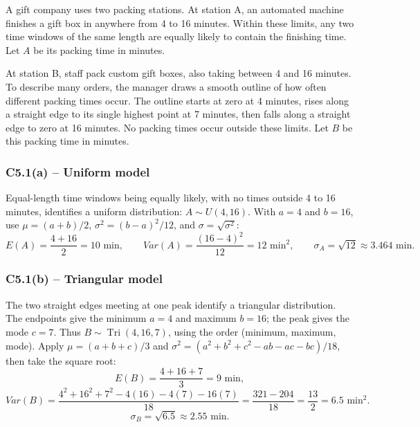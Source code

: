 {
A gift company uses two packing stations. At station A, an automated machine
finishes a gift box in anywhere from 4 to 16 minutes. Within these limits,
any two time windows of the same length are equally likely to contain the
finishing time. Let $A$ be its packing time in minutes.

At station B, staff pack custom gift boxes, also taking between 4 and 16
minutes. To describe many orders, the manager draws a smooth outline of how
often different packing times occur. The outline starts at zero at 4 minutes,
rises along a straight edge to its single highest point at 7 minutes, then
falls along a straight edge to zero at 16 minutes. No packing times occur
outside these limits. Let $B$ be this packing time in minutes.
\label{sol:c5-1a}
\subsubsection*{C5.1(a) -- Uniform model }
Equal-length time windows being equally likely, with no times outside
4 to 16 minutes, identifies a uniform distribution: $A\sim U(4,16)$.
With $a=4$ and $b=16$, use $\mu=(a+b)/2$,
$\sigma^2=(b-a)^2/12$, and $\sigma=\sqrt{\sigma^2}$:
\[
E(A)=\frac{4+16}{2}=10\text{ min},\qquad
Var(A)=\frac{(16-4)^2}{12}=12\text{ min}^2,
\qquad \sigma_A=\sqrt{12}\approx3.464\text{ min}.
\]
\label{sol:c5-1b}
\subsubsection*{C5.1(b) -- Triangular model }
The two straight edges meeting at one peak identify a triangular distribution.
The endpoints give the minimum $a=4$ and maximum $b=16$; the peak gives
the mode $c=7$. Thus $B\sim\operatorname{Tri}(4,16,7)$, using the order
(minimum, maximum, mode). Apply $\mu=(a+b+c)/3$ and
$\sigma^2=(a^2+b^2+c^2-ab-ac-bc)/18$, then take the square root:
\[
E(B)=\frac{4+16+7}{3}=9\text{ min},
\]
\[
Var(B)=\frac{4^2+16^2+7^2-4(16)-4(7)-16(7)}{18}
=\frac{321-204}{18}=\frac{13}{2}=6.5\text{ min}^2.
\]
\[
\sigma_B=\sqrt{6.5}\approx2.55\text{ min}.
\]
}


